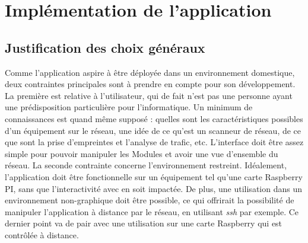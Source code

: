 \documentclass[]{article}
\begin{document}
\section{Implémentation de l'application}


\subsection{Justification des choix généraux}

Comme l'application aspire à être déployée dans un environnement domestique, deux contraintes principales sont à prendre en compte pour son développement. La première est relative à l'utilisateur, qui de fait n'est pas une personne ayant une prédisposition particulière pour l'informatique. Un minimum de connaissances est quand même supposé : quelles sont les caractéristiques possibles d'un équipement sur le réseau, une idée de ce qu'est un scanneur de réseau, de ce que sont la prise d'empreintes et l'analyse de trafic, etc. L'interface doit être assez simple pour pouvoir manipuler les Modules et avoir une vue d'ensemble du réseau. La seconde contrainte concerne l'environnement restreint. Idéalement, l'application doit être fonctionnelle sur un équipement tel qu'une carte Raspberry PI, sans que l'interactivité avec en soit impactée. De plus, une utilisation dans un environnement non-graphique doit être possible, ce qui offrirait la possibilité de manipuler l'application à distance par le réseau, en utilisant \textit{ssh} par exemple. Ce dernier point va de pair avec une utilisation sur une carte Raspberry qui est contrôlée à distance.\\
\end{document}

